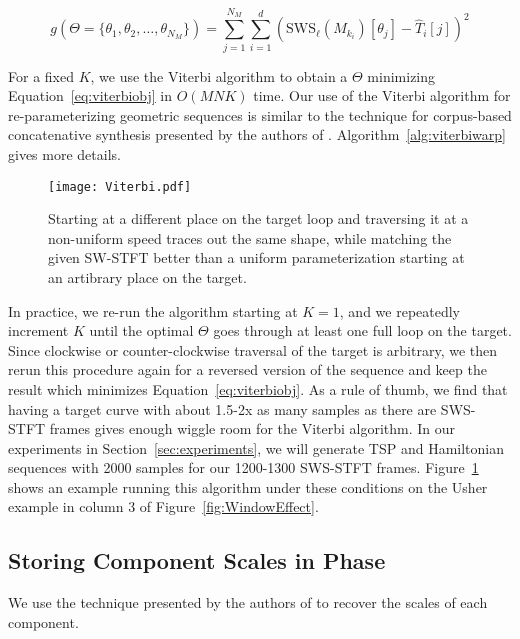 \documentclass[runningheads]{llncs}
\begin{document}
\begin{equation}
  \label{eq:viterbiobj}
  g(\Theta = \{\theta_1, \theta_2, \hdots, \theta_{N_M}\}) = \sum_{j = 1}^{N_M} \sum_{i=1}^d \left( \text{SWS}_{\ell} ({M_{k_i}})[\theta_j] - \hat{T}_i[j]  \right)^2
\end{equation}

For a fixed $K$, we use the Viterbi algorithm to obtain a $\Theta$ minimizing Equation~\ref{eq:viterbiobj} in $O(MNK)$ time.  Our use of the Viterbi algorithm for re-parameterizing geometric sequences is similar to the technique for corpus-based concatenative synthesis presented by the authors of \cite{schwarz2007corpus}.  Algorithm~\ref{alg:viterbiwarp} gives more details.  

\begin{figure}
  \centering
  \texttt{[image: Viterbi.pdf]}
  \caption{Starting at a different place on the target loop and traversing it at a non-uniform speed traces out the same shape, while matching the given SW-STFT better than a uniform parameterization starting at an artibrary place on the target.}
  \label{fig:ViterbiWarp}
\end{figure}

In practice, we re-run the algorithm starting at $K = 1$, and we repeatedly increment $K$ until the optimal $\Theta$ goes through at least one full loop on the target.  Since clockwise or counter-clockwise traversal of the target is arbitrary, we then rerun this procedure again for a reversed version of the sequence and keep the result which minimizes Equation~\ref{eq:viterbiobj}.  As a rule of thumb, we find that having a target curve with about 1.5-2x as many samples as there are SWS-STFT frames gives enough wiggle room for the Viterbi algorithm.  In our experiments in Section~\ref{sec:experiments}, we will generate TSP and Hamiltonian sequences with 2000 samples for our 1200-1300 SWS-STFT frames.  Figure~\ref{fig:ViterbiWarp} shows an example running this algorithm under these conditions on the Usher example in column 3 of Figure~\ref{fig:WindowEffect}.







\subsection{Storing Component Scales in Phase}
\label{sec:componentscales}

We use the technique presented by the authors of \cite{xiaoxiao_dong_data_2004} to recover the scales of each component.
\end{document}

